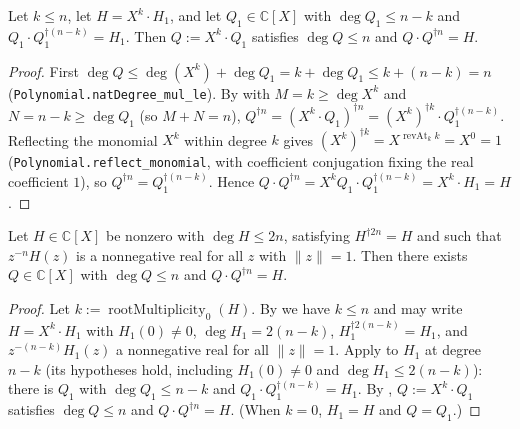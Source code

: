 \begin{lemma}
    \label{lem:fr-recombine}
    \leanok
    Let $k \le n$, let $H = X^{k}\cdot H_1$, and let $Q_1 \in \mathbb{C}[X]$ with
    $\deg Q_1 \le n - k$ and $Q_1\cdot Q_1^{\dagger (n-k)} = H_1$. Then
    $Q := X^{k}\cdot Q_1$ satisfies $\deg Q \le n$ and $Q\cdot Q^{\dagger n} = H$.
\end{lemma}
\begin{proof}
    First $\deg Q \le \deg(X^{k}) + \deg Q_1 = k + \deg Q_1 \le k + (n-k) = n$
    (\texttt{Polynomial.natDegree\_mul\_le}). By  with
    $M = k \ge \deg X^{k}$ and $N = n - k \ge \deg Q_1$ (so $M + N = n$),
    $Q^{\dagger n} = (X^{k}\cdot Q_1)^{\dagger n}
    = (X^{k})^{\dagger k}\cdot Q_1^{\dagger (n-k)}$. Reflecting the monomial
    $X^{k}$ within degree $k$ gives $(X^{k})^{\dagger k}
    = X^{\operatorname{revAt}_k k} = X^{0} = 1$
    (\texttt{Polynomial.reflect\_monomial}, with coefficient conjugation fixing the
    real coefficient $1$), so $Q^{\dagger n} = Q_1^{\dagger (n-k)}$. Hence
    $Q\cdot Q^{\dagger n} = X^{k} Q_1\cdot Q_1^{\dagger (n-k)}
    = X^{k}\cdot H_1 = H$.
\end{proof}

\begin{theorem}
    \label{thm:fejer-riesz}
    \leanok
    Let $H \in \mathbb{C}[X]$ be nonzero with $\deg H \le 2n$, satisfying
    $H^{\dagger 2n} = H$ and such that $z^{-n}H(z)$ is a nonnegative real for all
    $z$ with $\|z\| = 1$. Then there exists $Q \in \mathbb{C}[X]$ with
    $\deg Q \le n$ and $Q\cdot Q^{\dagger n} = H$.
\end{theorem}
\begin{proof}
    Let $k := \operatorname{rootMultiplicity}_0(H)$. By 
    we have $k \le n$ and may write $H = X^{k}\cdot H_1$ with $H_1(0) \neq 0$,
    $\deg H_1 = 2(n-k)$, $H_1^{\dagger 2(n-k)} = H_1$, and $z^{-(n-k)}H_1(z)$ a
    nonnegative real for all $\|z\| = 1$. Apply  to $H_1$
    at degree $n - k$ (its hypotheses hold, including $H_1(0) \neq 0$ and
    $\deg H_1 \le 2(n-k)$): there is $Q_1$ with $\deg Q_1 \le n - k$ and
    $Q_1\cdot Q_1^{\dagger (n-k)} = H_1$. By ,
    $Q := X^{k}\cdot Q_1$ satisfies $\deg Q \le n$ and $Q\cdot Q^{\dagger n} = H$.
    (When $k = 0$, $H_1 = H$ and $Q = Q_1$.)
\end{proof}

